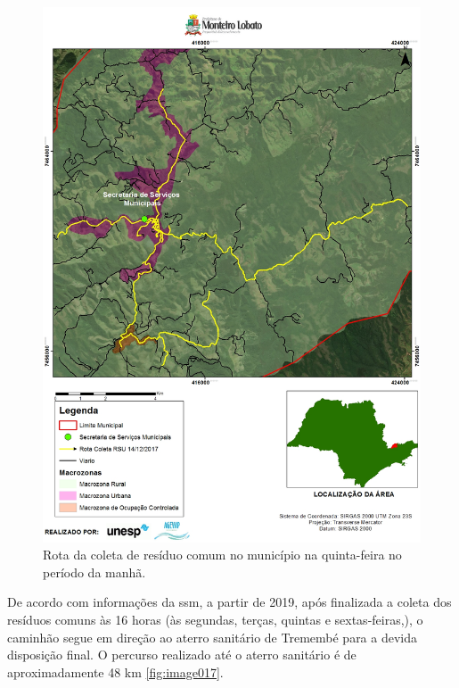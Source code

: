	\begin{figure}
		\centering
		\includegraphics[width=1\linewidth]{produtos/prodtres/image016}
		\caption{Rota da coleta de resíduo comum no município na quinta-feira no período da manhã.}
		\label{fig:image016}
	\end{figure}
	
	De acordo com informações da \gls{ssm}, a partir de 2019, após finalizada a coleta dos resíduos comuns às 16 horas (às segundas, terças, quintas e sextas-feiras,), o caminhão segue em direção ao aterro sanitário de Tremembé para a devida disposição final. O percurso realizado até o aterro sanitário é de aproximadamente 48 km \autoref{fig:image017}.
	
